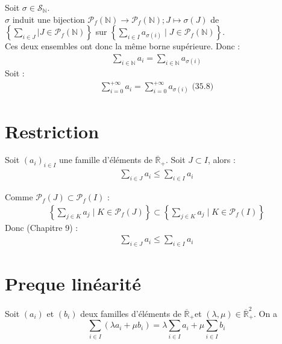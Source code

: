 \documentclass[../main.tex]{subfiles}
\begin{document}
\noindent Soit $\sigma\in \mathcal{S}_\mathbb{N}$. \\
$\sigma$ induit une bijection $\mathcal{P}_f(\mathbb{N})\to \mathcal{P}_f(\mathbb{N});J\mapsto \sigma(J)$ de $\left\{ \sum_{i\in J}| J\in \mathcal{P}_f(\mathbb{N}) \right\}$ sur $\left\{ \sum_{i\in I} a_{\sigma(i)}\mid J\in \mathcal{P}_f(\mathbb{N}) \right\}$. \\
Ces deux ensembles ont donc la même borne supérieure. Donc : 
\begin{align*}
    \sum_{i\in \mathbb{N}} a_i = \sum_{i\in \mathbb{N}} a_{\sigma(i)} 
\end{align*}
Soit : 
\begin{align*}
    \sum_{i=0}^{+\infty} a_i = \sum_{i=0}^{+\infty} a_{\sigma(i)} \text{ (35.8)}
\end{align*}

\section{Restriction}
\begin{tcolorbox}[title=Propostion 35.12, title filled=false, colframe=lightblue, colback=lightblue!10!white]
    Soit $(a_i)_{i \in I}$ une famille d'éléments de $\overline{\mathbb{R}}_{+}$. Soit $J\subset I$, alors : 
    \begin{align*}
        \sum_{i\in J} a_i \leq \sum_{i\in I} a_i
    \end{align*}
\end{tcolorbox}

\noindent Comme $\mathcal{P}_f(J)\subset \mathcal{P}_f(I)$ :
\begin{align*}
    \left\{ \sum_{j\in K} a_j\mid K\in \mathcal{P}_f(J) \right\} \subset \left\{ \sum_{j\in K} a_j\mid K\in \mathcal{P}_f(I) \right\}
\end{align*}
Donc (Chapitre 9) : 
\begin{align*}
    \sum_{i\in J} a_i \leq \sum_{i\in I} a_i
\end{align*}

\section{Preque linéarité}
\begin{tcolorbox}[title=Propostion 35.13, title filled=false, colframe=lightblue, colback=lightblue!10!white]
    Soit $\left(a_i\right)$ et $\left(b_i\right)$ deux familles d'éléments de $\overline{\mathbb{R}}_{+}$et $(\lambda, \mu) \in \overline{\mathbb{R}}_{+}^2$. On a
    $$\sum_{i \in I}\left(\lambda a_i+\mu b_i\right)=\lambda \sum_{i \in I} a_i+\mu \sum_{i \in I} b_i$$
\end{tcolorbox}
\end{document}
